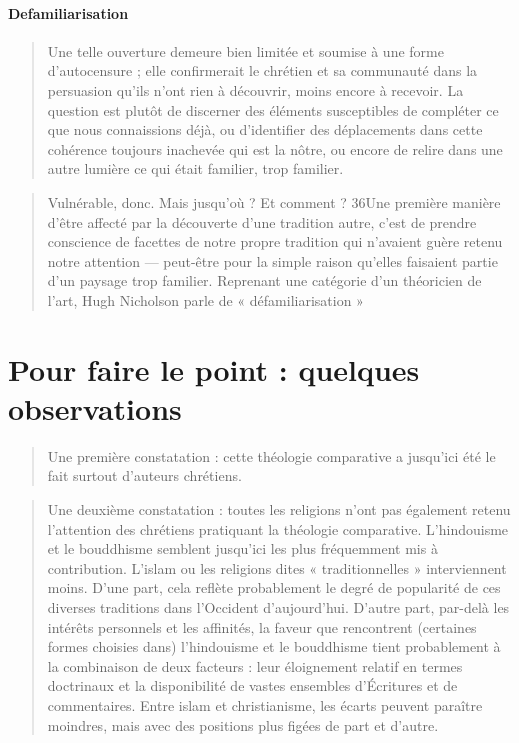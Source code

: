 \paragraph{Defamiliarisation}
\begin{quote}
        Une telle ouverture demeure bien limitée et soumise à une forme d’autocensure ; elle confirmerait le chrétien et sa communauté dans la persuasion qu’ils n’ont rien à découvrir, moins encore à recevoir. La question est plutôt de discerner des éléments susceptibles de compléter ce que nous connaissions déjà, ou d’identifier des déplacements dans cette cohérence toujours inachevée qui est la nôtre, ou encore de relire dans une autre lumière ce qui était familier, trop familier.
\end{quote}
\begin{quote}
        Vulnérable, donc. Mais jusqu’où ? Et comment ? 36Une première manière d’être affecté par la découverte d’une tradition autre, c’est de prendre conscience de facettes de notre propre tradition qui n’avaient guère retenu notre attention — peut-être pour la simple raison qu’elles faisaient partie d’un paysage trop familier. Reprenant une catégorie d’un théoricien de l’art, Hugh Nicholson parle de « défamiliarisation »
\end{quote}

 \section{Pour faire le point : quelques observations}
 
 \begin{quote}
        Une première constatation : cette théologie comparative a jusqu’ici été le fait surtout d’auteurs chrétiens.
\end{quote}
 \begin{quote}
        Une deuxième constatation : toutes les religions n’ont pas également retenu l’attention des chrétiens pratiquant la théologie comparative. L’hindouisme et le bouddhisme semblent jusqu’ici les plus fréquemment mis à contribution. L’islam ou les religions dites « traditionnelles » interviennent moins. D’une part, cela reflète probablement le degré de popularité de ces diverses traditions dans l’Occident d’aujourd’hui. D’autre part, par-delà les intérêts personnels et les affinités, la faveur que rencontrent (certaines formes choisies dans) l’hindouisme et le bouddhisme tient probablement à la combinaison de deux facteurs : leur éloignement relatif en termes doctrinaux et la disponibilité de vastes ensembles d’Écritures et de commentaires. Entre islam et christianisme, les écarts peuvent paraître moindres, mais avec des positions plus figées de part et d’autre.
\end{quote}
 

